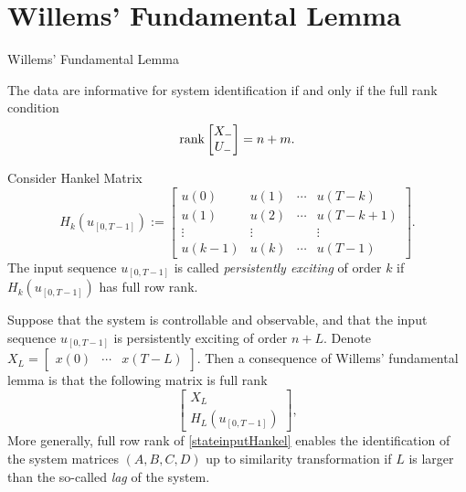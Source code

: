 \documentclass[aspectratio=169, handout, 10pt, hyperref=colorlinks]{beamer}
\begin{document}
\section{Willems' Fundamental Lemma}
\begin{frame}[allowframebreaks]{Willems' Fundamental Lemma}
    \begin{lem}
        The data are informative for system identification if and only if the full rank condition
        \begin{equation}\label{ch2:eq:inf for sys ident} 
        \operatorname{rank} \begin{bmatrix} X_- \\ U_- \end{bmatrix} = n+m. 
        \end{equation}
    \end{lem}
    Consider Hankel Matrix
    \[
    H_k(u_{[0,T-1]}) := \begin{bmatrix}
            u(0)    & u(1)      & \cdots    & u(T - k) \\
            u(1)    & u(2)      & \cdots    & u(T - k +1) \\
            \vdots  & \vdots    &           & \vdots  \\
            u(k-1)  & u(k)      & \cdots    & u(T-1) 
        \end{bmatrix}.
     \]
    The input sequence $u_{[0,T-1]}$ is called \textit{persistently exciting} of order $k$ if $H_k(u_{[0,T-1]})$ has full row rank. 

    Suppose that the system is controllable and observable, and that the input sequence $u_{[0,T-1]}$ is persistently exciting of order $n+L$. Denote $X_L =\begin{bmatrix} x(0) & \cdots & x(T-L) \end{bmatrix}$. Then a consequence of Willems' fundamental lemma is that the following matrix is full rank
    \begin{equation}
    \label{stateinputHankel}
    \begin{bmatrix} X_L \\ H_L(u_{[0,T-1]}) \end{bmatrix}, 
    \end{equation}
    More generally, full row rank of \eqref{stateinputHankel} enables the identification of the system matrices $(A,B,C,D)$ up to similarity transformation if $L$ is larger than the so-called \emph{lag} of the system.
\end{frame}
\end{document}
